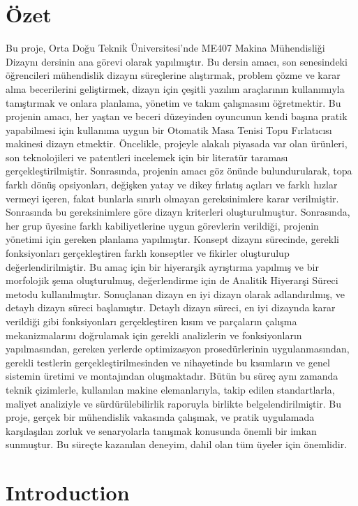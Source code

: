 \documentclass[12pt]{report}
\begin{document}
\chapter{Özet}
Bu proje, Orta Doğu Teknik Üniversitesi’nde ME407 Makina Mühendisliği Dizaynı dersinin ana görevi olarak yapılmıştır. Bu dersin amacı, son senesindeki öğrencileri mühendislik dizaynı süreçlerine alıştırmak, problem çözme ve karar alma becerilerini geliştirmek, dizayn için çeşitli yazılım araçlarının kullanımıyla tanıştırmak ve onlara planlama, yönetim ve takım çalışmasını öğretmektir. Bu projenin amacı, her yaştan ve beceri düzeyinden oyuncunun kendi başına pratik yapabilmesi için kullanıma uygun bir Otomatik Masa Tenisi Topu Fırlatıcısı makinesi dizayn etmektir. Öncelikle, projeyle alakalı piyasada var olan ürünleri, son teknolojileri ve patentleri incelemek için bir literatür taraması gerçekleştirilmiştir. Sonrasında, projenin amacı göz önünde bulundurularak, topa farklı dönüş opsiyonları, değişken yatay ve dikey fırlatış açıları ve farklı hızlar vermeyi içeren, fakat bunlarla sınırlı olmayan gereksinimlere karar verilmiştir. Sonrasında bu gereksinimlere göre dizayn kriterleri oluşturulmuştur. Sonrasında, her grup üyesine farklı kabiliyetlerine uygun görevlerin verildiği, projenin yönetimi için gereken planlama yapılmıştır. Konsept dizaynı sürecinde, gerekli fonksiyonları gerçekleştiren farklı konseptler ve fikirler oluşturulup değerlendirilmiştir. Bu amaç için bir hiyerarşik ayrıştırma yapılmış ve bir morfolojik şema oluşturulmuş, değerlendirme için de Analitik Hiyerarşi Süreci metodu kullanılmıştır. Sonuçlanan dizayn en iyi dizayn olarak adlandırılmış, ve detaylı dizayn süreci başlamıştır. Detaylı dizayn süreci, en iyi dizaynda karar verildiği gibi fonksiyonları gerçekleştiren kısım ve parçaların çalışma mekanizmalarını doğrulamak için gerekli analizlerin ve fonksiyonların yapılmasından, gereken yerlerde optimizasyon prosedürlerinin uygulanmasından, gerekli testlerin gerçekleştirilmesinden ve nihayetinde bu kısımların ve genel sistemin üretimi ve montajından oluşmaktadır. Bütün bu süreç aynı zamanda teknik çizimlerle, kullanılan makine elemanlarıyla, takip edilen standartlarla, maliyet analiziyle ve sürdürülebilirlik raporuyla birlikte belgelendirilmiştir. Bu proje, gerçek bir mühendislik vakasında çalışmak, ve pratik uygulamada karşılaşılan zorluk ve senaryolarla tanışmak konusunda önemli bir imkan sunmuştur. Bu süreçte kazanılan deneyim, dahil olan tüm üyeler için önemlidir.

\chapter{Introduction}
\end{document}
